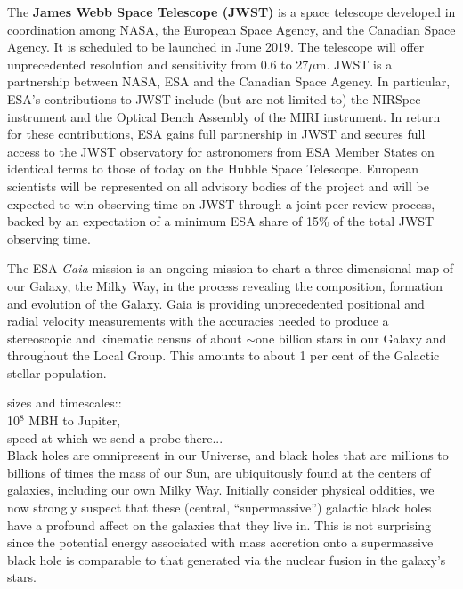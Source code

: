 \documentclass[oneside, a4paper, onecolumn, 11pt]{article}
\begin{document}
\begin{framed}
The {\bf James Webb Space Telescope (JWST)} is a space telescope
developed in coordination among NASA, the European Space Agency, and
the Canadian Space Agency. It is scheduled to be launched in June
2019. The telescope will offer unprecedented resolution and
sensitivity from 0.6 to 27$\mu$m.
JWST is a partnership between NASA, ESA and the Canadian Space Agency.
In particular, ESA's contributions to JWST include (but are not
limited to) the NIRSpec instrument and the Optical Bench Assembly of
the MIRI instrument.  In return for these contributions, ESA gains
full partnership in JWST and secures full access to the JWST
observatory for astronomers from ESA Member States on identical terms
to those of today on the Hubble Space Telescope. European scientists
will be represented on all advisory bodies of the project and will be
expected to win observing time on JWST through a joint peer review
process, backed by an expectation of a minimum ESA share of 15\% of
the total JWST observing time.


The ESA {\it Gaia} mission is an ongoing mission to chart a
three-dimensional map of our Galaxy, the Milky Way, in the process
revealing the composition, formation and evolution of the Galaxy. Gaia
is providing unprecedented positional and radial velocity measurements
with the accuracies needed to produce a stereoscopic and kinematic
census of about $\sim$one billion stars in our Galaxy and throughout
the Local Group. This amounts to about 1 per cent of the Galactic
stellar population.

\end{framed}



sizes and timescales:: \\
10$^{8}$ MBH to Jupiter, \\
speed at which we send a probe there...\\




Black holes are omnipresent in our Universe, and black holes that are
millions to billions of times the mass of our Sun, are ubiquitously
found at the centers of galaxies, including our own Milky Way.
Initially consider physical oddities, we now strongly suspect that
these (central, ``supermassive'') galactic black holes have a profound
affect on the galaxies that they live in. This is not surprising since
the potential energy associated with mass accretion onto a
supermassive black hole is comparable to that generated via the
nuclear fusion in the galaxy's stars.
\end{document}
